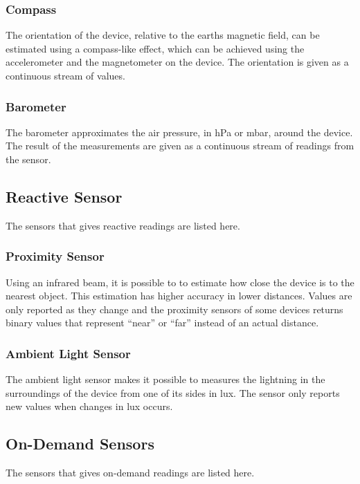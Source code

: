 \subsubsection{Compass}
\label{sub:compass}
The orientation of the device, relative to the earths magnetic field, can be estimated using a compass-like effect, which can be achieved using the accelerometer and the magnetometer on the device. The orientation is given as a continuous stream of values.

\subsubsection{Barometer}
\label{sub:barometer}
The barometer approximates the air pressure, in hPa or mbar, around the device. The result of the measurements are given as a continuous stream of readings from the sensor. 

\subsection{Reactive Sensor}
\label{sub:on_change_reporting_sensors}
The sensors that gives reactive readings are listed here.

\subsubsection{Proximity Sensor}
\label{sub:proximity_sensor}
Using an infrared beam, it is possible to to estimate how close the device is to the nearest object. This estimation has higher accuracy in lower distances. Values are only reported as they change and the proximity sensors of some devices returns binary values that represent ``near'' or ``far'' instead of an actual distance.

\subsubsection{Ambient Light Sensor}
\label{sub:ambient_light_sensor}
The ambient light sensor makes it possible to measures the lightning in the surroundings of the device from one of its sides in lux. The sensor only reports new values when changes in lux occurs.

\subsection{On-Demand Sensors}
\label{sub:on_demand_sensors}
The sensors that gives on-demand readings are listed here.

